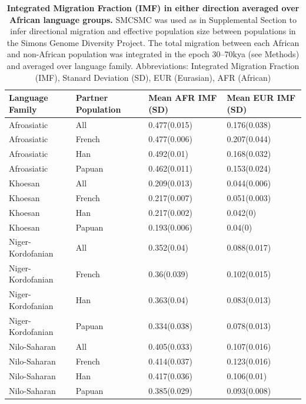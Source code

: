 \begin{table}[ht]
\centering
\begin{tabular}{llll}
  \hline
Language Family & Partner Population & Mean AFR IMF (SD) & Mean EUR IMF (SD) \\ 
  \hline
Afroasiatic & All & 0.477(0.015) & 0.176(0.038) \\ 
  Afroasiatic & French & 0.477(0.006) & 0.207(0.044) \\ 
  Afroasiatic & Han & 0.492(0.01) & 0.168(0.032) \\ 
  Afroasiatic & Papuan & 0.462(0.011) & 0.153(0.024) \\ 
  Khoesan & All & 0.209(0.013) & 0.044(0.006) \\ 
  Khoesan & French & 0.217(0.007) & 0.051(0.003) \\ 
  Khoesan & Han & 0.217(0.002) & 0.042(0) \\ 
  Khoesan & Papuan & 0.193(0.006) & 0.04(0) \\ 
  Niger-Kordofanian & All & 0.352(0.04) & 0.088(0.017) \\ 
  Niger-Kordofanian & French & 0.36(0.039) & 0.102(0.015) \\ 
  Niger-Kordofanian & Han & 0.363(0.04) & 0.083(0.013) \\ 
  Niger-Kordofanian & Papuan & 0.334(0.038) & 0.078(0.013) \\ 
  Nilo-Saharan & All & 0.405(0.033) & 0.107(0.016) \\ 
  Nilo-Saharan & French & 0.414(0.037) & 0.123(0.016) \\ 
  Nilo-Saharan & Han & 0.417(0.036) & 0.106(0.01) \\ 
  Nilo-Saharan & Papuan & 0.385(0.029) & 0.093(0.008) \\ 
   \hline
\end{tabular}
\caption[Tests for difference between integrated migration fractions in the SGDP averaged over African language families]{{\bf Integrated Migration Fraction (IMF) in either direction averaged over African language groups.} SMCSMC was used as in Supplemental Section  to infer directional migration and effective population size between populations in the Simons Genome Diversity Project. The total migration between each African and non-African population was integrated in the epoch 30--70kya (see Methods) and averaged over language family. Abbreviations: Integrated Migration Fraction (IMF), Stanard Deviation (SD), EUR (Eurasian), AFR (African)} 
\label{table:average_sgdp_migration_table}
\end{table}

